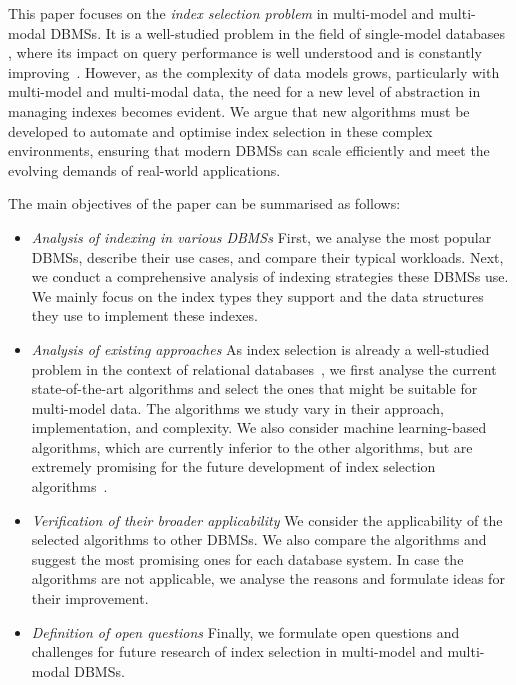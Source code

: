This paper focuses on the \textit{index selection problem} in multi-model and multi-modal DBMSs. It is a well-studied problem in the field of single-model databases \citep{IndexSurvey20, Anytime20, AutoAdmin, CoPhy11, DRL, MCTS}, where its impact on query performance is well understood and is constantly improving~\citep{IndexSurvey20}. However, as the complexity of data models grows, particularly with multi-model and multi-modal data, the need for a new level of abstraction in managing indexes becomes evident. We argue that new algorithms must be developed to automate and optimise index selection in these complex environments, ensuring that modern DBMSs can scale efficiently and meet the evolving demands of real-world applications.

The main objectives of the paper can be summarised as follows:
\begin{itemize}
    \item \textit{Analysis of indexing in various DBMSs} First, we analyse the most popular DBMSs, describe their use cases, and compare their typical workloads.
    Next, we conduct a comprehensive analysis of indexing strategies these DBMSs use. We mainly focus on the index types they support and the data structures they use to implement these indexes.
    \item \textit{Analysis of existing approaches} As index selection is already a well-studied problem in the context of relational databases~\citep{IndexSurvey20}, we first analyse the current state-of-the-art algorithms and select the ones that might be suitable for multi-model data. The algorithms we study vary in their approach, implementation, and complexity. We also consider machine learning-based algorithms, which are currently inferior to the other algorithms, but are extremely promising for the future development of index selection algorithms~\citep{AI4DB}.
    \item \textit{Verification of their broader applicability}
    We consider the applicability of the selected algorithms to other DBMSs.
    We also compare the algorithms and suggest the most promising ones for each database system.
    In case the algorithms are not applicable, we analyse the reasons and formulate ideas for their improvement.
    \item \textit{Definition of open questions} Finally, we formulate open questions and challenges for future research of index selection in multi-model and multi-modal DBMSs.
\end{itemize}

